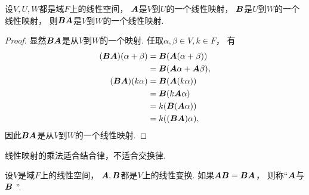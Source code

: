 \begin{proposition}
设\(V,U,W\)都是域\(F\)上的线性空间，
\(\boldsymbol{A}\)是\(V\)到\(U\)的一个线性映射，
\(\boldsymbol{B}\)是\(U\)到\(W\)的一个线性映射，
则\(\boldsymbol{B}\boldsymbol{A}\)是\(V\)到\(W\)的一个线性映射.
\begin{proof}
显然\(\boldsymbol{B}\boldsymbol{A}\)是从\(V\)到\(W\)的一个映射.
任取\(\alpha,\beta \in V,
k \in F\)，
有\begin{align*}
	(\boldsymbol{B}\boldsymbol{A})(\alpha+\beta)
	&= \boldsymbol{B}(\boldsymbol{A}(\alpha+\beta)) \\
	&= \boldsymbol{B}(\boldsymbol{A}\alpha+\boldsymbol{A}\beta), \\
	(\boldsymbol{B}\boldsymbol{A})(k\alpha)
	&= \boldsymbol{B}(\boldsymbol{A}(k \alpha)) \\
	&= \boldsymbol{B}(k \boldsymbol{A}\alpha) \\
	&= k(\boldsymbol{B}(\boldsymbol{A}\alpha)) \\
	&= k((\boldsymbol{B}\boldsymbol{A}) \alpha),
\end{align*}
因此\(\boldsymbol{B}\boldsymbol{A}\)是从\(V\)到\(W\)的一个线性映射.
\end{proof}
\end{proposition}

\begin{proposition}\label{theorem:线性映射.线性映射的乘法适合结合律但不适合交换律}
线性映射的乘法适合结合律，不适合交换律.
\end{proposition}
\begin{definition}
设\(V\)是域\(F\)上的线性空间，
\(\boldsymbol{A},\boldsymbol{B}\)都是\(V\)上的线性变换.
如果\(\boldsymbol{A}\boldsymbol{B}=\boldsymbol{B}\boldsymbol{A}\)，
则称“\(\boldsymbol{A}\)与\(\boldsymbol{B}\) ”.
\end{definition}

